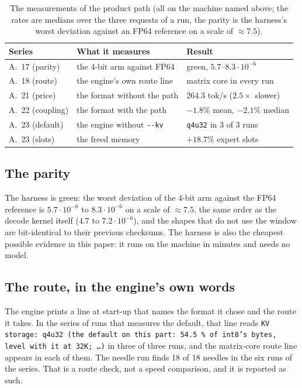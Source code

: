\documentclass[10pt,twocolumn]{article}
\begin{document}
\begin{table}[t]
\centering
\caption{The measurements of the product path (all on the machine named above; the rates are medians over
the three requests of a run, the parity is the harness's worst deviation against an FP64 reference on a scale
of $\approx 7.5$).}
\label{tab:meas}
\begin{tabularx}{\linewidth}{@{}lXX@{}}
\toprule
Series & What it measures & Result \\
\midrule
A.~17 (parity) & the 4-bit arm against FP64 & green, $5.7$--$8.3\cdot10^{-6}$ \\
A.~18 (route) & the engine's own route line & matrix core in every run \\
A.~21 (price) & the format without the path & 264.3 tok/s ($2.5\times$ slower) \\
A.~22 (coupling) & the format with the path & $-1.8\%$ mean, $-2.1\%$ median \\
A.~23 (default) & the engine without \texttt{-{}-kv} & \texttt{q4u32} in 3 of 3 runs \\
A.~23 (slots) & the freed memory & $+18.7\%$ expert slots \\
\bottomrule
\end{tabularx}
\end{table}

\subsection{The parity}

The harness is green: the worst deviation of the 4-bit arm against the FP64 reference is
$5.7\cdot10^{-6}$ to $8.3\cdot10^{-6}$ on a scale of $\approx 7.5$, the same order as the decode kernel
itself ($4.7$ to $7.2\cdot10^{-6}$), and the shapes that do not use the window are bit-identical to their
previous checksums. The harness is also the cheapest possible evidence in this paper: it runs on the
machine in minutes and needs no model.

\subsection{The route, in the engine's own words}

The engine prints a line at start-up that names the format it chose and the route it takes. In the
series of runs that measures the default, that line reads \texttt{KV storage: q4u32 (the default on this
part: 54.5\,\% of int8's bytes, level with it at 32K; \dots)} in three of three runs, and the matrix-core
route line appears in each of them. The needle run finds 18 of 18 needles in the six runs of the series.
That is a route check, not a speed comparison, and it is reported as such.
\end{document}

